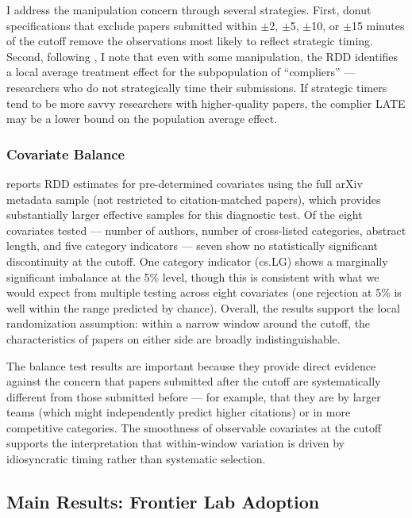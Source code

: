 \documentclass[12pt]{article}
\begin{document}
I address the manipulation concern through several strategies. First, donut specifications that exclude papers submitted within $\pm$2, $\pm$5, $\pm$10, or $\pm$15 minutes of the cutoff remove the observations most likely to reflect strategic timing. Second, following \citet{gerard2020}, I note that even with some manipulation, the RDD identifies a local average treatment effect for the subpopulation of ``compliers'' --- researchers who do not strategically time their submissions. If strategic timers tend to be more savvy researchers with higher-quality papers, the complier LATE may be a lower bound on the population average effect.

\subsubsection{Covariate Balance}

 reports RDD estimates for pre-determined covariates using the full arXiv metadata sample (not restricted to citation-matched papers), which provides substantially larger effective samples for this diagnostic test. Of the eight covariates tested --- number of authors, number of cross-listed categories, abstract length, and five category indicators --- seven show no statistically significant discontinuity at the cutoff. One category indicator (cs.LG) shows a marginally significant imbalance at the 5\% level, though this is consistent with what we would expect from multiple testing across eight covariates (one rejection at 5\% is well within the range predicted by chance). Overall, the results support the local randomization assumption: within a narrow window around the cutoff, the characteristics of papers on either side are broadly indistinguishable.


  


The balance test results are important because they provide direct evidence against the concern that papers submitted after the cutoff are systematically different from those submitted before --- for example, that they are by larger teams (which might independently predict higher citations) or in more competitive categories. The smoothness of observable covariates at the cutoff supports the interpretation that within-window variation is driven by idiosyncratic timing rather than systematic selection.

\subsection{Main Results: Frontier Lab Adoption}
\end{document}
